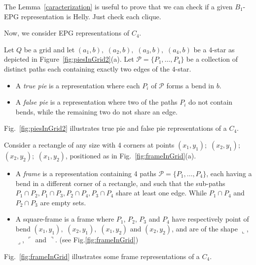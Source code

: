 The Lemma~\ref{caracterization} is useful to prove that we can check if a given $B_1$-EPG representation is Helly. Just check each clique. 

Now, we consider EPG representations of $C_4$.

\begin{definition} \label{defi:tortasFrame}
Let $ Q $ be a grid and let $ (a_1, b),$ $(a_2, b),$ $(a_3, b),$ $(a_4, b)$ be a 4-star as depicted in Figure~\ref{fig:piesInGrid2}(a). Let $ \mathcal{P} = \{P_1, \dots , P_4\}$ be a collection of distinct paths each containing exactly two edges of the $4$-star.
\begin{itemize}
\item A \emph{true pie} is a representation where each $P_i$ of $ \mathcal{P} $ forms a bend in $b$.

\item A \emph {false pie} is a representation where two of the paths $P_i$ do not contain bends, while the remaining two do not share an edge. 
\end{itemize}
\end{definition}

Fig.~\ref{fig:piesInGrid2} illustrates true pie and false pie representations of a $C_4$.



\begin{definition} \label{defi:tortasFrame2}
 Consider a rectangle of any size with 4 corners at points $ (x_1, y_1);$ $(x_2, y_1);$ $(x_2, y_2);$ $(x_1, y_2) $, positioned as in  Fig.~\ref{fig:frameInGrid}(a). 
 \begin{itemize}
 \item A \emph{frame} is a representation containing 4 paths $\mathcal{P} =  \{ P_1, \dots, P_4\} $, each having a bend in a different corner of a rectangle, and such that the  sub-paths $ P_1 \cap P_2, P_1 \cap P_3, P_2 \cap P_4, P_3 \cap P_4 $ share at least one edge. While $P_1 \cap P_4 $ and $ P_2 \cap P_3$ are empty sets.
 
 \item A square-frame is a frame where $P_1$, $P_2$, $P_3$ and $P_4$ have respectively point of bend $ (x_1, y_1),$ $(x_2, y_1),$ $(x_1, y_2)$ and $(x_2, y_2)$, and are of the shape $\llcorner$, $\lrcorner$, $\ulcorner$ and $\urcorner$.  (see Fig.\ref{fig:frameInGrid})
 \end{itemize}
\end{definition}

Fig.~\ref{fig:frameInGrid} illustrates some frame representations of a $C_4$.





